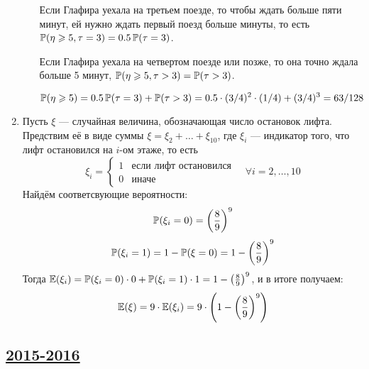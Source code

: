 \begin{enumerate}
\begin{enumerate}
Если Глафира уехала на третьем поезде, то чтобы ждать больше пяти минут,
ей нужно ждать первый поезд больше минуты,
то есть $\P(\eta \geq 5, \tau = 3)=0.5 \P(\tau = 3)$.

Если Глафира уехала на четвертом поезде или позже, то она точно ждала больше 5 минут,
$\P(\eta \geq 5, \tau >3)=\P(\tau>3)$.

\[
\P(\eta \geq 5) = 0.5\P(\tau = 3) + \P(\tau > 3) = 0.5 \cdot (3/4)^2 \cdot (1/4) + (3/4)^3 = 63 / 128
\]

\end{enumerate}
\item Пусть $\xi$ — случайная величина, обозначающая число остановок лифта. Предствим её в виде суммы $\xi = \xi_2 + \ldots + \xi_{10}$, где $\xi_i$ — индикатор
того, что лифт остановился на $i$-ом этаже, то есть
\[
\xi_i = \begin{cases}
1 & \text{если лифт остановился} \\
0 & \text{иначе}
\end{cases}
\quad \forall i = 2, \ldots, 10
\]
Найдём соответсвующие вероятности:
\[
\P(\xi_i = 0) = \left(\frac{8}{9}\right)^9
\]
\[
\P(\xi_i = 1) = 1 - \P(\xi = 0) = 1 - \left(\frac{8}{9}\right)^9
\]
Тогда $\E(\xi_i) = \P(\xi_i = 0) \cdot 0 + \P(\xi_i = 1) \cdot 1 = 1 - \left(\frac{8}{9}\right)^9$, и в итоге получаем:
\[
\E(\xi) = 9 \cdot \E(\xi_i) = 9 \cdot \left(1 - \left(\frac{8}{9}\right)^9\right)
\]
\end{enumerate}




\subsection[2015-2016]{\hyperref[sec:kr_01_2015_2016]{2015-2016}}
\label{sec:sol_kr_01_2015_2016}

